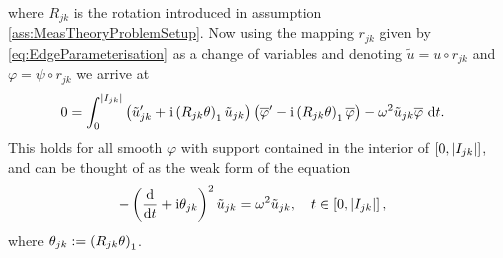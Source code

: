 where $R_{jk}$ is the rotation introduced in assumption \ref{ass:MeasTheoryProblemSetup}.
Now using the mapping $r_{jk}$ given by \eqref{eq:EdgeParameterisation} as a change of variables and denoting $\tilde{u} = u \circ r_{jk}$ and $\varphi = \psi\circ r_{jk}$ we arrive at
\begin{align*}
	0 &= \int_{0}^{\left\lvert I_{jk} \right\rvert} \left( \tilde{u}_{jk}' + \mathrm{i}\left( R_{jk}\theta \right)_1 \tilde{u}_{jk} \right)\left( \overline{\varphi}' - \mathrm{i}\left( R_{jk}\theta \right)_1 \overline{\varphi}  \right) - \omega^2 \tilde{u}_{jk}\overline{\varphi} \ \mathrm{d} t .
\end{align*}
This holds for all smooth $\varphi$ with support contained in the interior of $\left[ 0,\left\lvert I_{jk} \right\rvert \right]$, and can be thought of as the weak form of the equation
\begin{align*}
	-\left( \dfrac{\mathrm{d}}{\mathrm{d}t} + \mathrm{i}\theta_{jk} \right)^2 \tilde{u}_{jk} &= \omega^2 \tilde{u}_{jk}, \quad t\in\left[ 0,\left\lvert I_{jk} \right\rvert \right],
\end{align*}
where $\theta_{jk} := \left( R_{jk}\theta \right)_1$.


